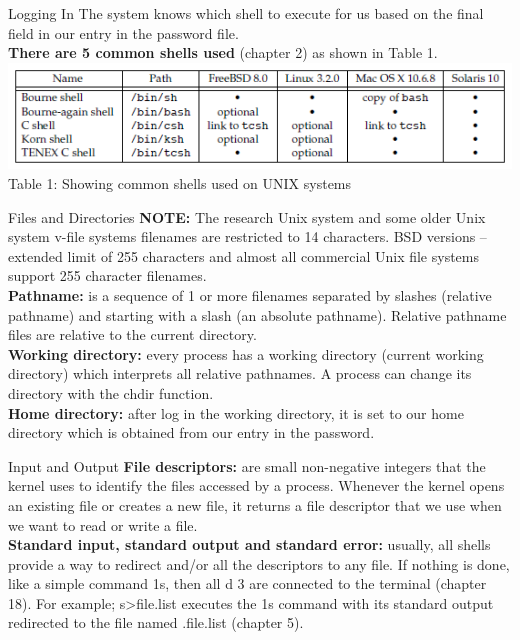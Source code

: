 \documentclass[newPxFont,sthlmFooter,nooffset]{beamer}
\begin{document}
\begin{frame}[t]{Logging In}\vspace{10pt}
The system knows which shell to execute for us based on the final field in our entry in the password file.\\[10pt]\textbf{There are 5 common shells used} (chapter 2) as shown in Table 1.
\\[6pt]\includegraphics[scale=0.8]{shellstable.png}
Table 1: Showing common shells used on UNIX systems
\end{frame}

\begin{frame}[t]{Files and Directories}
\textbf{NOTE:} The research Unix system and some older Unix system v-file systems filenames are restricted to 14 characters. BSD versions – extended limit of 255 characters and almost all commercial Unix file systems support 255 character filenames.
\\[10pt]\textbf{Pathname:} is a sequence of 1 or more filenames separated by slashes (relative pathname) and starting with a slash (an absolute pathname). Relative pathname files are relative to the current directory.
\\[4pt]\textbf{Working directory:} every process has a working directory (current working directory) which interprets all relative pathnames. A process can change its directory with the chdir function.\\[10pt]
\textbf{Home directory:} after log in the working directory, it is set to our home directory which is obtained from our entry in the password.

\end{frame}

\begin{frame}[t]{Input and Output}
\textbf{File descriptors:} are small non-negative integers that the kernel uses to identify the files accessed by a process. Whenever the kernel opens an existing file or creates a new file, it returns a file descriptor that we use when we want to read or write a file.\\[6pt]
\textbf{Standard input, standard output and standard error:} usually, all shells provide a way to redirect and/or all the descriptors to any file. If nothing is done, like a simple command 1s, then all d 3 are connected to the terminal (chapter 18). For example; s>file.list executes the 1s command with its standard output redirected to the file named .file.list (chapter 5).

\end{frame}
\end{document}
